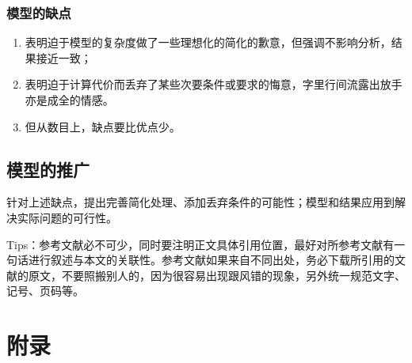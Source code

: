 \documentclass[12pt,utf8]{article}
\begin{document}
\subsubsection{模型的缺点}

\begin{enumerate}
\item 表明迫于模型的复杂度做了一些理想化的简化的歉意，但强调不影响分析，结果接近一致；
\item 表明迫于计算代价而丢弃了某些次要条件或要求的悔意，字里行间流露出放手亦是成全的情感。
\item 但从数目上，缺点要比优点少。
\end{enumerate}

\subsection{模型的推广}
 针对上述缺点，提出完善简化处理、添加丢弃条件的可能性；模型和结果应用到解决实际问题的可行性。
 \cite{詹志辉CoevolutionaryParticleSwarmOptimizationWithBottleneckObjectiveLearningStrategyforMany-ObjectiveOptimization}
 \cite{冯茜基于改进粒子群算法的多目标优化及其应用}
 
 
\newpage


Tips：参考文献必不可少，同时要注明正文具体引用位置，最好对所参考文献有一句话进行叙述与本文的关联性。参考文献如果来自不同出处，务必下载所引用的文献的原文，不要照搬别人的，因为很容易出现跟风错的现象，另外统一规范文字、记号、页码等。

\clearpage

\section*{附录}

\appendix
\end{document}
